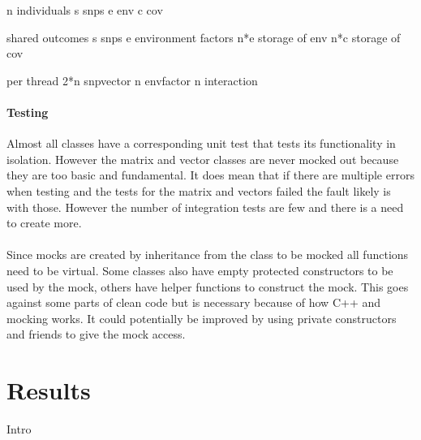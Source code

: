 \documentclass[10pt,a4paper]{report}
\begin{document}

n individuals
s snps
e env
c cov

shared
outcomes
s snps
e environment factors
n*e storage of env
n*c storage of cov

per thread
2*n snpvector
n envfactor
n interaction


\subsubsection{Testing}
Almost all classes have a corresponding unit test that tests its functionality in isolation. However the matrix and vector classes are never mocked out because they are too basic and fundamental. It does mean that if there are multiple errors when testing and the tests for the matrix and vectors failed the fault likely is with those. However the number of integration tests are few and there is a need to create more.\\
\\
Since mocks are created by inheritance from the class to be mocked all functions need to be virtual. Some classes also have empty protected constructors to be used by the mock, others have helper functions to construct the mock. This goes against some parts of clean code but is necessary because of how C++ and mocking works. It could potentially be improved by using private constructors and friends to give the mock access.


\chapter{Results}
Intro\\
\end{document}
